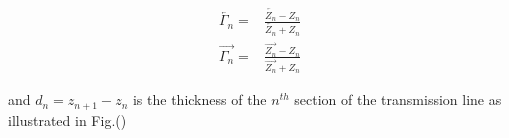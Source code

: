 \documentclass[11pt]{article}
\renewcommand{\^}{\hat}  %
\begin{document}
\begin{subequations}
  \begin{align}
  \overleftarrow{\Gamma_n} ={}& \frac{\overleftarrow{Z_n} - Z_n}{\overleftarrow{Z_n} + Z_n}
    \label{eq:R_left}\\
    \overrightarrow{\Gamma_n} ={}& \frac{\overrightarrow{Z_n} - Z_n}{\overrightarrow{Z_n} + Z_n}
      \label{eq:R_right}
  \end{align}
  \label{eq:R}
\end{subequations}

and $d_n = z_{n+1} - z_n$ is the thickness of the $n^{th}$ section of the transmission line as illustrated in Fig.()






  \clearpage %
  
  
\end{document}

